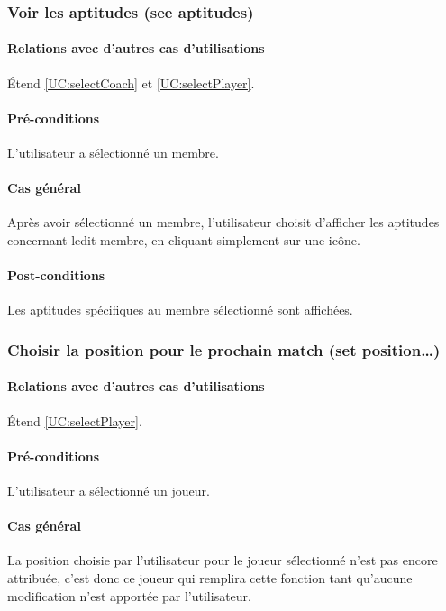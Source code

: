 \subsubsection{Voir les aptitudes (see aptitudes)}
\label{UC:seeAptitudes}
\paragraph{Relations avec d'autres cas d'utilisations}
Étend \ref{UC:selectCoach} et \ref{UC:selectPlayer}.
\paragraph{Pré-conditions}
\begin{list}{}{\leftmargin=1.5em}
\item{L'utilisateur a sélectionné un membre.}
\end{list}
\paragraph{Cas général}
Après avoir sélectionné un membre, l'utilisateur choisit d'afficher les aptitudes concernant ledit membre, en cliquant simplement sur une icône.
\paragraph{Post-conditions}
\begin{list}{}{\leftmargin=1.5em}
\item{Les aptitudes spécifiques au membre sélectionné sont affichées.}
\end{list} 

\subsubsection{Choisir la position pour le prochain match (set position…)}
\label{UC:choosePosition}
\paragraph{Relations avec d'autres cas d'utilisations}
Étend \ref{UC:selectPlayer}.
\paragraph{Pré-conditions}
L'utilisateur a sélectionné un joueur.
\paragraph{Cas général}
La position choisie par l'utilisateur pour le joueur sélectionné n'est pas encore attribuée, c'est donc ce joueur qui remplira cette fonction tant qu'aucune modification n'est apportée par l'utilisateur.
